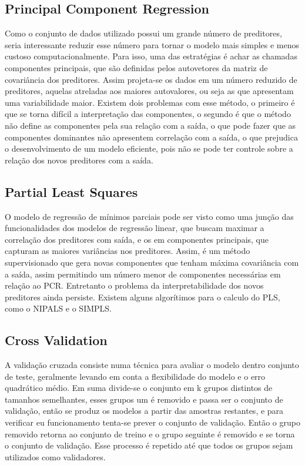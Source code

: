 \subsection{Principal Component Regression}
Como o conjunto de dados utilizado possui um grande
número de preditores, seria interessante reduzir esse número para tornar o modelo mais simples e menos custoso computacionalmente. Para isso, uma das estratégias é achar as chamadas componentes principais, que são definidas pelos autovetores da matriz de covariância dos preditores. Assim projeta-se os dados em um número reduzido de preditores, aquelas atreladas aos maiores autovalores, ou seja as que apresentam uma variabilidade maior. Existem dois problemas com esse método, o primeiro é que se torna difícil a interpretação das componentes, o segundo é que o método não define as componentes pela sua relação com a saída, o que pode fazer que as componentes dominantes não apresentem correlação com a saída, o que prejudica o desenvolvimento de um modelo eficiente, pois não se pode ter controle sobre a relação dos novos preditores com a saída.

\subsection{Partial Least Squares}
O modelo de regressão de mínimos parciais pode ser visto como uma junção das funcionalidades dos modelos de regressão linear, que buscam maximar a correlação dos preditores com saída, e os em componentes principais, que capturam as maiores variâncias nos preditores. Assim, é um método supervisionado que gera novas componentes que tenham máxima covariância com a saída, assim permitindo um número menor de componentes necessárias em relação ao PCR. Entretanto o problema da interpretabilidade dos novos preditores ainda persiste. Existem alguns algorítimos para o calculo do PLS, como o NIPALS e o SIMPLS.

\subsection{Cross Validation}

A validação cruzada consiste numa técnica para avaliar o modelo dentro conjunto de teste, geralmente levando em conta a flexibilidade do modelo e o erro quadrático médio. Em suma divide-se o conjunto em k grupos distintos de tamanhos semelhantes, esses grupos um é removido e passa ser o conjunto de validação, então se produz os modelos a partir das amostras restantes, e para verificar  eu funcionamento tenta-se prever o conjunto de validação. Então o grupo removido retorna ao conjunto de treino e o grupo seguinte é removido e se torna o conjunto de validação. Esse processo é repetido até que todos os grupos sejam utilizados como validadores.

